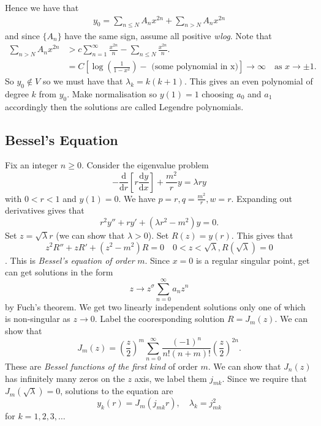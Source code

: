 \documentclass{article}
\begin{document}
Hence we have that
\begin{align*}
	y_0=\sum_{n\le N }A_nx^{2n}+\sum_{n>N}A_nx^{2n}
\end{align*}
and since $ \{A_n\} $ have the same sign, assume all positive \textit{wlog}. Note that
\begin{align*}
	\sum_{n>N}A_nx^{2n}&>c\sum_{n=1}^\infty\frac{x^{2n}}n-\sum_{n\le N}\frac{x^{2n}}n.\\
			   &=C\left[\log\left(\frac1{1-x^2}\right)-\text{ (some polynomial in x)}\right]\to \infty\quad \text{as }x\to \pm 1.
\end{align*}
So $ y_0\notin V $ so we must have that $ \lambda_k=k(k+1) $. This gives an even polynomial of degree $ k $ from $ y_0 $. Make normalisation so $ y(1)=1 $ choosing $ a_0 $ and $ a_1 $ accordingly then the solutions are called Legendre polynomials.
\subsection{Bessel's Equation}
Fix an integer $ n\ge 0 $. Consider the eigenvalue problem
\[
	-\frac{\mathrm d}{\mathrm dr}\left[r\frac{\mathrm dy}{\mathrm dx}\right]+\frac {m^2}ry=\lambda ry
\]
with $ 0<r<1 $ and $ y(1)=0 $. We have $ p=r,q=\frac{m^2}r,w=r $. Expanding out derivatives gives that
\[
  r^2y''+ry'+(\lambda r^2-m^2)y=0.
\]\smallskip
Set $ z=\sqrt{\lambda}r $ (we can show that $ \lambda>0 $). Set $ R(z)=y(r) $. This gives that
\[
	z^2R''+zR'+(z^2-m^2)R=0 \quad 0<z<\sqrt{\lambda}, R(\sqrt{\lambda})=0
\].
This is \textit{Bessel's equation of order} $ m $.
Since $ x=0 $ is a regular singular point, get can get solutions in the form \[
	z\to z^\sigma\sum_{n=0}^\infty a_nz^n
\]
by Fuch's theorem. We get two linearly independent solutions only one of which is non-singular as $ z\to 0 $. Label the cooresponding solution $ R=J_m(z) $. We can show that
\[
	J_m(z)=\left(\frac z2\right)^m\sum_{n=0}^\infty\frac{(-1)^n}{n!(n+m)!}\left(\frac z2\right)^{2n}.
\]
These are \textit{Bessel functions of the first kind} of order $ m $. We can show that $ J_n(z) $ has infinitely many zeros on the $ z $ axis, we label them $ j_{mk} $. Since we require that $ J_m(\sqrt{\lambda})=0 $, solutions to the equation are
\[
	y_k(r)=J_m(j_{mk}r),\quad \lambda_k=j_{mk}^2
\]
for $ k=1,2,3,\dots $
\end{document}
